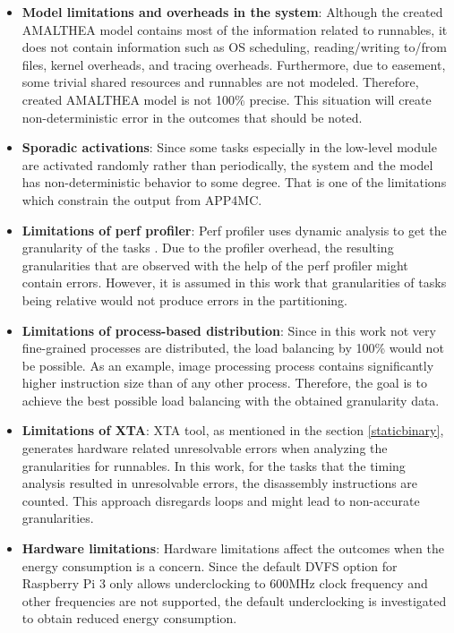 \begin{itemize}
	\item \textbf{Model limitations and overheads in the system}: Although the created AMALTHEA model contains most of the information related to runnables, it does not contain information such as OS scheduling, reading/writing to/from files, kernel overheads, and tracing overheads. Furthermore, due to easement, some trivial shared resources and runnables are not modeled. Therefore, created AMALTHEA model is not 100\% precise. This situation will create non-deterministic error in the outcomes that should be noted. 
	\item \textbf{Sporadic activations}: Since some tasks especially in the low-level module are activated randomly rather than periodically, the system and the model has non-deterministic behavior to some degree. That is one of the limitations which constrain the output from APP4MC. %
	\item \textbf{Limitations of perf profiler}: Perf profiler uses dynamic analysis to get the granularity of the tasks \cite{perf2}. Due to the profiler overhead, the resulting granularities that are observed with the help of the perf profiler might contain errors. However, it is assumed in this work that granularities of tasks being relative would not produce errors in the partitioning.
	\item \textbf{Limitations of process-based distribution}: Since in this work not very fine-grained processes are distributed, the load balancing by 100\% would not be possible. As an example, image processing process contains significantly higher instruction size than of any other process. Therefore, the goal is to achieve the best possible load balancing with the obtained granularity data. %
	\item \textbf{Limitations of XTA}: XTA tool, as mentioned in the section \ref{staticbinary}, generates hardware related unresolvable errors when analyzing the granularities for runnables. In this work, for the tasks that the timing analysis resulted in unresolvable errors, the disassembly instructions are counted. This approach disregards loops and might lead to non-accurate granularities.
	\item \textbf{Hardware limitations}: Hardware limitations affect the outcomes when the energy consumption is a concern. Since the default DVFS option for Raspberry Pi 3 only allows underclocking to 600MHz clock frequency and other frequencies are not supported, the default underclocking is investigated to obtain reduced energy consumption.%

\end{itemize}
